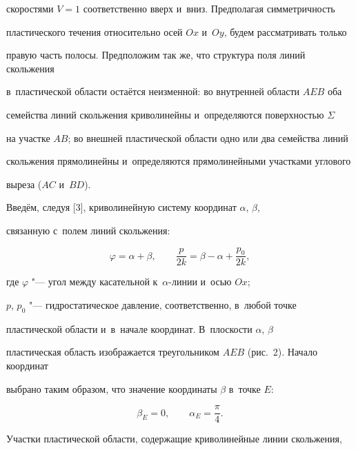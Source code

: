скоростями \mbox{$V = 1$} соответственно вверх и~вниз. Предполагая симметричность 

пластического течения относительно осей $Ox$ и~$Oy$, будем рассматривать только 

правую часть полосы. Предположим так же, что структура поля линий скольжения 

в~пластической области остаётся неизменной: во внутренней области $AEB$ оба 

семейства линий скольжения криволинейны и~определяются поверхностью $\Sigma $ 

на участке $AB$; во внешней пластической области одно или два семейства линий 

скольжения прямолинейны и~определяются прямолинейными участками углового 

выреза ($AC$ и~$BD$).



Введём, следуя [3], криволинейную систему координат $\alpha$, $\beta $, 

связанную с~полем линий скольжения:

\begin{equation}

\label{khromov:eq1}

\varphi = \alpha + \beta ,\qquad \frac{p}{2k} = \beta - \alpha + \frac{p_0 }{2k},

\end{equation}

где $\varphi $ "--- угол между касательной к~$\alpha $-линии и~осью $Ox$; 

$p$, $p_0 $ "--- гидростатическое давление, соответственно, в~любой точке 

пластической области и~в~начале координат. В~плоскости $\alpha$, $\beta $ 

пластическая область изображается треугольником $AEB$ (рис.~2). Начало координат 

выбрано таким образом, что значение координаты $\beta$ в~точке $E$: 

\begin{equation}

\label{khromov:eq2}

\beta _E = 0,\qquad \alpha _E = \frac{\pi }{4}.

\end{equation}







Участки пластической области, содержащие криволинейные линии скольжения, 

